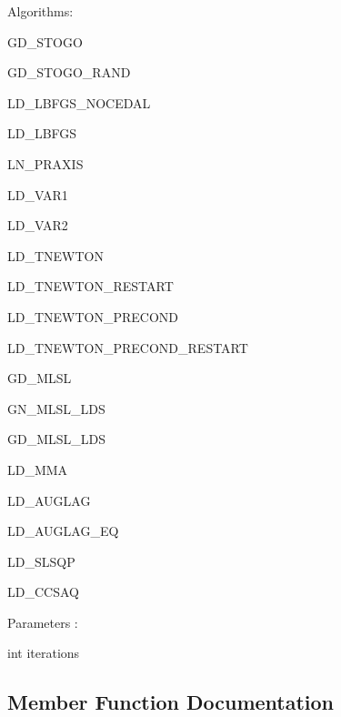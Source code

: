 Algorithms\+:
\begin{DoxyItemize}
\item G\+D\+\_\+\+S\+T\+O\+G\+O
\item G\+D\+\_\+\+S\+T\+O\+G\+O\+\_\+\+R\+A\+N\+D
\item L\+D\+\_\+\+L\+B\+F\+G\+S\+\_\+\+N\+O\+C\+E\+D\+A\+L
\item L\+D\+\_\+\+L\+B\+F\+G\+S
\item L\+N\+\_\+\+P\+R\+A\+X\+I\+S
\item L\+D\+\_\+\+V\+A\+R1
\item L\+D\+\_\+\+V\+A\+R2
\item L\+D\+\_\+\+T\+N\+E\+W\+T\+O\+N
\item L\+D\+\_\+\+T\+N\+E\+W\+T\+O\+N\+\_\+\+R\+E\+S\+T\+A\+R\+T
\item L\+D\+\_\+\+T\+N\+E\+W\+T\+O\+N\+\_\+\+P\+R\+E\+C\+O\+N\+D
\item L\+D\+\_\+\+T\+N\+E\+W\+T\+O\+N\+\_\+\+P\+R\+E\+C\+O\+N\+D\+\_\+\+R\+E\+S\+T\+A\+R\+T
\item G\+D\+\_\+\+M\+L\+S\+L
\item G\+N\+\_\+\+M\+L\+S\+L\+\_\+\+L\+D\+S
\item G\+D\+\_\+\+M\+L\+S\+L\+\_\+\+L\+D\+S
\item L\+D\+\_\+\+M\+M\+A
\item L\+D\+\_\+\+A\+U\+G\+L\+A\+G
\item L\+D\+\_\+\+A\+U\+G\+L\+A\+G\+\_\+\+E\+Q
\item L\+D\+\_\+\+S\+L\+S\+Q\+P
\item L\+D\+\_\+\+C\+C\+S\+A\+Q
\end{DoxyItemize}

Parameters \+:
\begin{DoxyItemize}
\item int iterations 
\end{DoxyItemize}

\subsection{Member Function Documentation}
\hypertarget{structlimbo_1_1opt_1_1_n_l_opt_grad_a248805060cc986c4553d91f738b8b725}{}
